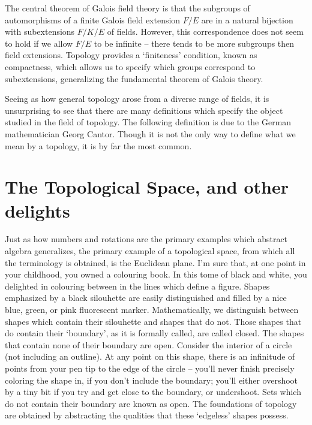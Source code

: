 \begin{example}
    The central theorem of Galois field theory is that the subgroups of automorphisms of a finite Galois field extension $F/E$ are in a natural bijection with subextensions $F/K/E$ of fields. However, this correspondence does not seem to hold if we allow $F/E$ to be infinite -- there tends to be more subgroups then field extensions. Topology provides a `finiteness' condition, known as compactness, which allows us to specify which groups correspond to subextensions, generalizing the fundamental theorem of Galois theory.
\end{example}

Seeing as how general topology arose from a diverse range of fields, it is unsurprising to see that there are many definitions which specify the object studied in the field of topology. The following definition is due to the German mathematician Georg Cantor. Though it is not the only way to define what we mean by a topology, it is by far the most common.

\section{The Topological Space, and other delights}

Just as how numbers and rotations are the primary examples which abstract algebra generalizes, the primary example of a topological space, from which all the terminology is obtained, is the Euclidean plane. I'm sure that, at one point in your childhood, you owned a colouring book. In this tome of black and white, you delighted in colouring between in the lines which define a figure. Shapes emphasized by a black silouhette are easily distinguished and filled by a nice blue, green, or pink fluorescent marker. Mathematically, we distinguish between shapes which contain their silouhette and shapes that do not. Those shapes that do contain their `boundary', as it is formally called, are called closed. The shapes that contain none of their boundary are open. Consider the interior of a circle (not including an outline). At any point on this shape, there is an infinitude of points from your pen tip to the edge of the circle -- you'll never finish precisely coloring the shape in, if you don't include the boundary; you'll either overshoot by a tiny bit if you try and get close to the boundary, or undershoot. Sets which do not contain their boundary are known as open. The foundations of topology are obtained by abstracting the qualities that these `edgeless' shapes possess.

